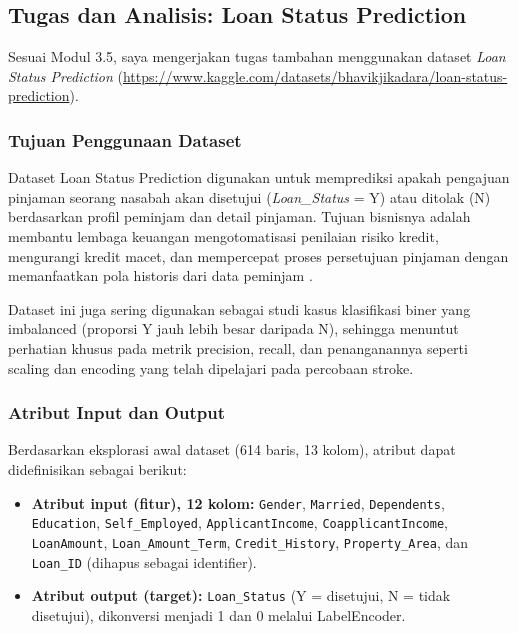 \documentclass[a4paper,oneside,12pt]{report}
\begin{document}
\subsection{Tugas dan Analisis: Loan Status Prediction}
Sesuai Modul 3.5, saya mengerjakan tugas tambahan menggunakan dataset \textit{Loan Status Prediction} (\url{https://www.kaggle.com/datasets/bhavikjikadara/loan-status-prediction}).

\subsubsection{Tujuan Penggunaan Dataset}
Dataset Loan Status Prediction digunakan untuk memprediksi apakah pengajuan pinjaman seorang nasabah akan disetujui (\textit{Loan\_Status} = Y) atau ditolak (N) berdasarkan profil peminjam dan detail pinjaman. Tujuan bisnisnya adalah membantu lembaga keuangan mengotomatisasi penilaian risiko kredit, mengurangi kredit macet, dan mempercepat proses persetujuan pinjaman dengan memanfaatkan pola historis dari data peminjam \cite{kaggle-loan}.

Dataset ini juga sering digunakan sebagai studi kasus klasifikasi biner yang imbalanced (proporsi Y jauh lebih besar daripada N), sehingga menuntut perhatian khusus pada metrik precision, recall, dan penanganannya seperti scaling dan encoding yang telah dipelajari pada percobaan stroke.

\subsubsection{Atribut Input dan Output}
Berdasarkan eksplorasi awal dataset (614 baris, 13 kolom), atribut dapat didefinisikan sebagai berikut:

\begin{itemize}
    \item \textbf{Atribut input (fitur), 12 kolom:} \texttt{Gender}, \texttt{Married}, \texttt{Dependents}, \texttt{Education}, \texttt{Self\_Employed}, \texttt{ApplicantIncome}, \texttt{CoapplicantIncome}, \texttt{LoanAmount}, \texttt{Loan\_Amount\_Term}, \texttt{Credit\_History}, \texttt{Property\_Area}, dan \texttt{Loan\_ID} (dihapus sebagai identifier).
    \item \textbf{Atribut output (target):} \texttt{Loan\_Status} (Y = disetujui, N = tidak disetujui), dikonversi menjadi 1 dan 0 melalui LabelEncoder.
\end{itemize}
\end{document}
